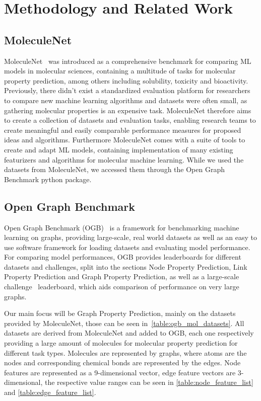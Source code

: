 \section{Methodology and Related Work}

\subsection{MoleculeNet}
MoleculeNet~\cite{2018moleculenet} was introduced as a comprehensive benchmark for comparing ML models in molecular sciences, containing a multitude of tasks for molecular property prediction, among others including solubility, toxicity and bioactivity. Previously, there didn't exist a standardized evaluation platform for researchers to compare new machine learning algorithms and datasets were often small, as gathering molecular properties is an expensive task. MoleculeNet therefore aims to create a collection of datasets and evaluation tasks, enabling research teams to create meaningful and easily comparable performance measures for proposed ideas and algorithms. Furthermore MoleculeNet comes with a suite of tools to create and adapt ML models, containing implementation of many existing featurizers and algorithms for molecular machine learning. While we used the datasets from MoleculeNet, we accessed them through the Open Graph Benchmark python package.

\subsection{Open Graph Benchmark}
Open Graph Benchmark (OGB)~\cite{2021ogb} is a framework for benchmarking machine learning on graphs, providing large-scale, real world datasets as well as an easy to use software framework for loading  datasets and evaluating model performance.
For comparing model performances, OGB provides leaderboards for different datasets and challenges, split into the sections Node Property Prediction, Link Property Prediction and Graph Property Prediction, as well as a large-scale challenge~\cite{hu2021ogblsc} leaderboard, which aids comparison of performance on very large graphs.

Our main focus will be Graph Property Prediction, mainly on the datasets provided by MoleculeNet, those can be seen in~\autoref{table:ogb_mol_datasets}. All datasets are derived from MoleculeNet and added to OGB, each one respectively providing a large amount of molecules for molecular property prediction for different task types. Molecules are represented by graphs, where atoms are the nodes and corresponding chemical bonds are represented by the edges. Node features are represented as a 9-dimensional vector, edge feature vectors are 3-dimensional, the respective value ranges can be seen in \autoref{table:node_feature_list} and \autoref{table:edge_feature_list}.

